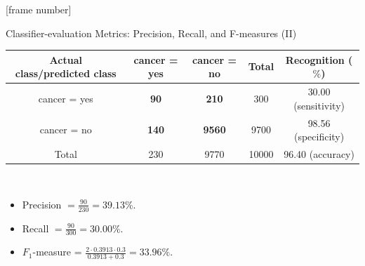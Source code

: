 \documentclass[aspectratio=169,t,table]{beamer}
\begin{document}
  {
    [frame number]
    \begin{frame}{Classifier-evaluation Metrics: Precision, Recall, and F-measures (II)}
      \centering
      \begin{tabular}{|c|c|c|c|c|}
        \hline
        Actual class/predicted class & cancer = yes & cancer = no & Total & Recognition ($\%$) \\\hline
        cancer = yes & \textbf{90} & \textbf{210} & 300 & 30.00 (sensitivity) \\\hline
        cancer = no & \textbf{140} & \textbf{9560} & 9700 & 98.56 (specificity) \\\hline
        Total & 230 & 9770 & 10000 & 96.40 (accuracy) \\\hline
      \end{tabular}\\[0.2cm]
      \begin{itemize}
        \item Precision $= \frac{90}{230} = 39.13 \%$.
        \item Recall $=\frac{90}{300} = 30.00 \%$.
        \item $F_1$-measure = $\frac{2 \cdot 0.3913 \cdot 0.3}{0.3913 + 0.3} = 33.96 \%$.
      \end{itemize}
    \end{frame}
  }
\end{document}
